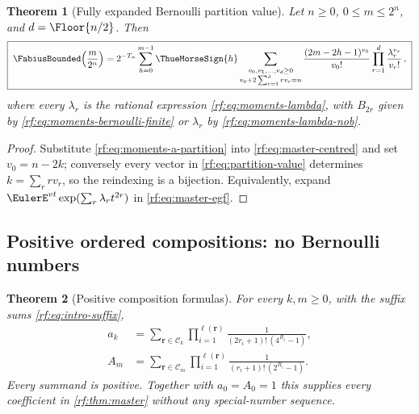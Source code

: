 \documentclass[11pt,oneside]{article}
\theoremstyle{plain}
\newtheorem{theorem}{Theorem}[section]
\theoremstyle{definition}
\theoremstyle{remark}
\newcommand{\Fb}{\FabiusBounded}            %
\newcommand{\tm}[1]{\ThueMorseSign{#1}}     %
\newcommand{\Comp}[1]{\mathcal{C}_{#1}}     %
\newcommand{\Tr}[1]{T_{#1}}                 %
\begin{document}
\begin{theorem}[Fully expanded Bernoulli partition value]
\label{rf:thm:partition-value}
Let $n\ge0$, $0\le m\le2^{n}$, and $d=\Floor{n/2}$.  Then
\begin{equation}
 \boxed{\;
 \Fb\!\left(\frac{m}{2^{n}}\right)
 =2^{-\Tr{n}}\sum_{h=0}^{m-1}\tm{h}
  \sum_{\substack{v_{0},v_{1},\ldots,v_{d}\ge0\\ v_{0}+2\sum_{r=1}^{d}rv_{r}=n}}
  \frac{(2m-2h-1)^{v_{0}}}{v_{0}!}\prod_{r=1}^{d}\frac{\lambda_{r}^{v_{r}}}{v_{r}!}\,,\;}
 \label{rf:eq:partition-value}
\end{equation}
where every $\lambda_{r}$ is the rational expression
\cref{rf:eq:moments-lambda}, with $B_{2r}$ given by
\cref{rf:eq:moments-bernoulli-finite} or $\lambda_{r}$ by
\cref{rf:eq:moments-lambda-nob}.
\end{theorem}

\begin{proof}
Substitute \cref{rf:eq:moments-a-partition} into
\cref{rf:eq:master-centred} and set $v_{0}=n-2k$; conversely every vector in
\cref{rf:eq:partition-value} determines $k=\sum_{r}rv_{r}$, so the reindexing
is a bijection.  Equivalently, expand $\EulerE^{vt}\exp(\sum_{r}\lambda_{r}t^{2r})$
in \cref{rf:eq:master-egf}.
\end{proof}

\subsection{Positive ordered compositions: no Bernoulli numbers}
\label{rf:sec:moments-compositions}

\begin{theorem}[Positive composition formulas]
\label{rf:thm:moments-composition}
For every $k,m\ge0$, with the suffix sums \cref{rf:eq:intro-suffix},
\begin{align}
 a_{k}&=\sum_{\mathbf r\in\Comp{k}}\prod_{i=1}^{\ell(\mathbf r)}
       \frac{1}{(2r_{i}+1)!\,(4^{R_{i}}-1)},
 \label{rf:eq:moments-a-composition}\\
 A_{m}&=\sum_{\mathbf r\in\Comp{m}}\prod_{i=1}^{\ell(\mathbf r)}
       \frac{1}{(r_{i}+1)!\,(2^{R_{i}}-1)}.
 \label{rf:eq:moments-A-composition}
\end{align}
Every summand is positive.  Together with $a_{0}=A_{0}=1$ this supplies
every coefficient in \cref{rf:thm:master} without any special-number
sequence.
\end{theorem}
\end{document}
